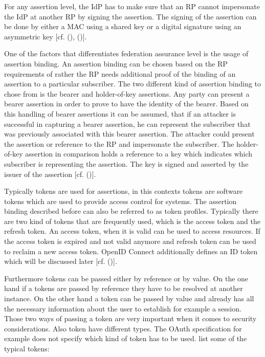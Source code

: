 For any assertion level, the IdP has to make sure that an RP cannot impersonate the IdP at another RP by signing the assertion. The signing of the assertion can be done by either a MAC using a shared key or a digital signature using an asymmetric key [cf. (\cite{NIST:2017:DIG}), (\cite{NIST:2017:DIGFA})].  

One of the factors that differentiates federation assurance level is the usage of assertion binding. An assertion binding can be chosen based on the RP requirements of rather the RP needs additional proof of the binding of an assertion to a particular subscriber. The two different kind of assertion binding to chose from is the bearer and holder-of-key assertions. Any party can present a bearer assertion in order to prove to have the identity of the bearer. Based on this handling of bearer assertions it can be assumed, that if an attacker is successful in capturing a bearer assertion, he can represent the subscriber that was previously associated with this bearer assertion. The attacker could present the assertion or reference to the RP and impersonate the subscriber. The holder-of-key assertion in comparison holds a reference to a key which indicates which subscriber is representing the assertion. The key is signed and asserted by the issuer of the assertion  [cf. (\cite{NIST:2017:DIGFA})].

Typically tokens are used for assertions, in this contexts tokens are software tokens which are used to provide access control for systems. The assertion binding described before can also be referred to as token profiles. Typically there are two kind of tokens that are frequently used, which is the access token and the refresh token. An access token, when it is valid can be used to access resources. If the access token is expired and not valid anymore and refresh token can be used to reclaim a new access token. OpenID Connect additionally defines an ID token which will be discussed later [cf. (\cite{Spencer:2018:APISecurity})]. 

Furthermore tokens can be passed either by reference or by value. On the one hand if a tokens are passed by reference they have to be resolved at another instance. On the other hand a token can be passed by value and already has all the necessary information about the user to establish for example a session. Those two ways of passing a token are very important when it comes to security considerations. Also token have different types. The OAuth specification for example does not specify which kind of token has to be used. \cite{Spencer:2018:APISecurity} list some of the typical tokens: 

